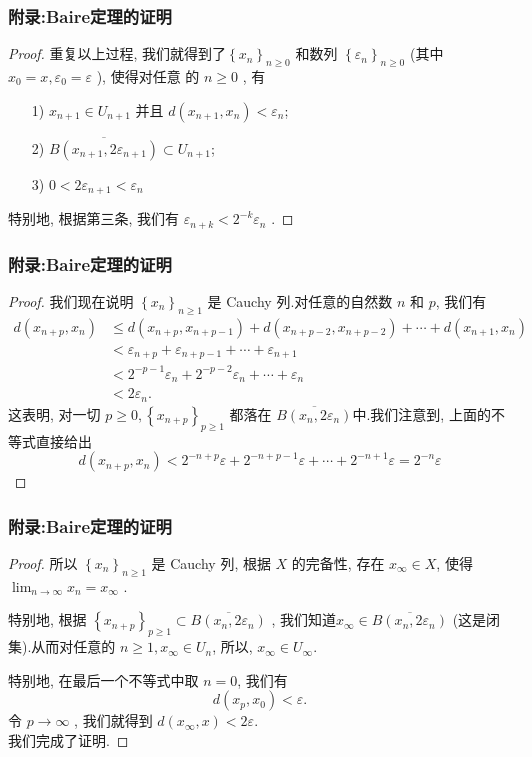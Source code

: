 \documentclass[12pt,aspectratio=169,mathserif]{beamer}
\begin{document}
\begin{frame}
	\frametitle{附录:Baire定理的证明}
	\begin{proof}
	重复以上过程, 我们就得到了$  \left\{x_{n}\right\}_{n \geqslant 0} $ 和数列 $ \left\{\varepsilon_{n}\right\}_{n \geqslant 0}$  (其中  $x_{0}=x, \varepsilon_{0}=\varepsilon $ ), 使得对任意 的  $n \geqslant 0$ , 有
	\begin{itemize}
		\item[1)]$ x_{n+1} \in U_{n+1}$  并且 $ d\left(x_{n+1}, x_{n}\right)<\varepsilon_{n}$;
		\item[2)]$ \overline{B\left(x_{n+1}, 2 \varepsilon_{n+1}\right)} \subset U_{n+1} $;
		\item[3)]$0<2 \varepsilon_{n+1}<\varepsilon_{n} $
	\end{itemize}
\pause
特别地, 根据第三条, 我们有  $\varepsilon_{n+k}<2^{-k} \varepsilon_{n}$  .

	\end{proof}
\end{frame}
		\begin{frame}
		\frametitle{附录:Baire定理的证明}
		\begin{proof}
			我们现在说明 $ \left\{x_{n}\right\}_{n \geqslant 1}$  是 Cauchy 列.对任意的自然数 $ n$  和 $p $, 我们有
			$$
			\begin{aligned}
				d\left(x_{n+p}, x_{n}\right) & \leqslant d\left(x_{n+p}, x_{n+p-1}\right)+d\left(x_{n+p-2}, x_{n+p-2}\right)+\cdots+d\left(x_{n+1}, x_{n}\right) \\
				&<\varepsilon_{n+p}+\varepsilon_{n+p-1}+\cdots+\varepsilon_{n+1} \\
				&<2^{-p-1} \varepsilon_{n}+2^{-p-2} \varepsilon_{n}+\cdots+\varepsilon_{n} \\
				&<2 \varepsilon_{n} .
			\end{aligned}
			$$
			\pause
			这表明, 对一切  $p \geqslant 0,\left\{x_{n+p}\right\}_{p \geqslant 1}$  都落在 $ \overline{B\left(x_{n}, 2 \varepsilon_{n}\right)}  $中.我们注意到, 上面的不等式直接给出
			$$
			d\left(x_{n+p}, x_{n}\right)<2^{-n+p} \varepsilon+2^{-n+p-1} \varepsilon+\cdots+2^{-n+1} \varepsilon=2^{-n} \varepsilon
			$$
		\end{proof}
		\end{frame}
	\begin{frame}
		\frametitle{附录:Baire定理的证明}
		\begin{proof}
		所以 $ \left\{x_{n}\right\}_{n \geqslant 1} $ 是 Cauchy 列, 根据 $ X$  的完备性, 存在 $ x_{\infty} \in X $, 使得 $ \lim _{n \rightarrow \infty} x_{n}=x_{\infty} $ .\pause
		
		 特别地, 根据 $ \left\{x_{n+p}\right\}_{p \geqslant 1} \subset \overline{B\left(x_{n}, 2 \varepsilon_{n}\right)}$ , 我们知道$  x_{\infty} \in \overline{B\left(x_{n}, 2 \varepsilon_{n}\right)} $ (这是闭集).从而对任意的 $ n \geqslant 1, x_{\infty} \in U_{n} $, 所以, $ x_{\infty} \in U_{\infty}  $.\pause
		 
		 特别地, 在最后一个不等式中取 $ n=0 $, 我们有
		$$
		d\left(x_{p}, x_{0}\right)<\varepsilon .
		$$
		令 $ p \rightarrow \infty$ , 我们就得到  $d\left(x_{\infty}, x\right)<2 \varepsilon  $.\\
		我们完成了证明.
		\end{proof}
	\end{frame}
\end{document}
